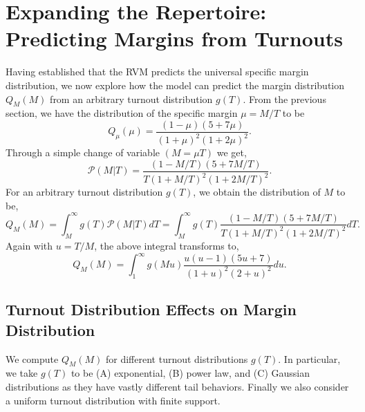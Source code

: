 \section{Expanding the Repertoire: Predicting Margins from Turnouts}
Having established that the RVM predicts the universal specific margin distribution, we now explore how the model can predict the margin distribution $Q_M(M)$ from an arbitrary turnout distribution $g(T)$. From the previous section, we have the distribution of the specific margin $\mu = M / T$ to be
\begin{equation}
    Q_{\mu}\left(\mu\right) = \frac{(1 - \mu)(5 + 7\mu)}{(1 + \mu)^2(1 + 2\mu)^2}.
\end{equation}
Through a simple change of variable $(M = \mu T)$ we get,
\begin{equation}
    \mathcal{P}(M|T) = \frac{(1 - M / T)(5 + 7M /T)}{T(1 + M / T)^2(1 + 2M / T)^2}.
\end{equation}
For an arbitrary turnout distribution $g(T)$, we obtain the distribution of $M$ to be,
\begin{equation}
    Q_M(M) = \int_{M}^{\infty}g(T)\mathcal{P}(M |T) dT = \int_{M}^{\infty}g(T)\frac{(1 - M / T)(5 + 7M /T)}{T(1 + M / T)^2(1 + 2M / T)^2} dT.
\end{equation}
Again with $u = T / M$, the above integral transforms to,
\begin{equation}
    Q_M(M) = \int_{1}^{\infty}g(Mu)\frac{u(u - 1)(5u + 7)}{(1 + u)^2 (2 + u)^2}du.
    \label{eq:pm}
\end{equation}
\subsection{Turnout Distribution Effects on Margin Distribution}
We compute $Q_M(M)$ for different turnout distributions $g(T)$. In particular, we take $g(T)$ to be (A) exponential, (B) power law, and (C) Gaussian distributions as they have vastly different tail behaviors. Finally we also consider a uniform turnout distribution with finite support.
